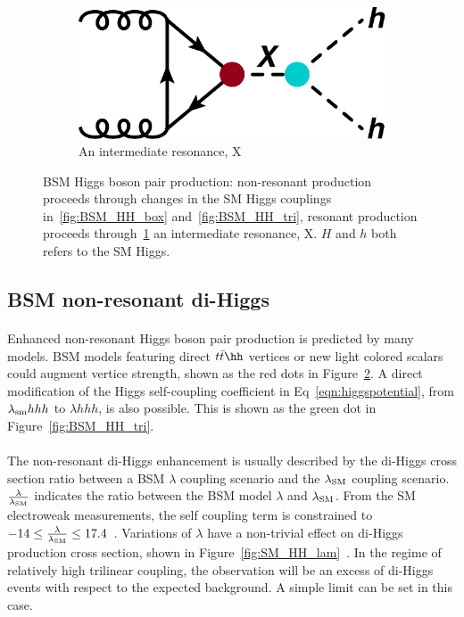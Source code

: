 \begin{figure}[htbp!]
\begin{subfigure}[c]{0.3\textwidth}
        \includegraphics[width=\textwidth]{figures/theory/BSM_HH_X}
        \caption{An intermediate resonance, X}
        \label{fig:BSM_HH_X}
    \end{subfigure}
\caption{BSM Higgs boson pair production: non-resonant production proceeds through changes in the SM Higgs couplings in~\ref{fig:BSM_HH_box} and~\ref{fig:BSM_HH_tri}, resonant production proceeds through~\ref{fig:BSM_HH_X} an intermediate resonance, X. $H$ and $h$ both refers to the SM Higgs.}
\label{fig:BSM_HH}
\end{figure}

\subsection{BSM non-resonant di-Higgs}
\paragraph{}
Enhanced non-resonant Higgs boson pair production is predicted by many models. BSM models featuring direct $t\bar{t}\hh$ vertices \cite{Grober:2010yv, Contino:2012xk} or new light colored scalars \cite{PhysRevD.86.095023} could augment vertice strength, shown as the red dots in Figure~\ref{fig:BSM_HH}. 
A direct modification of the Higgs self-coupling coefficient in Eq~\ref{eqn:higgspotential}, from $\lambda_{\rm sm}hhh$ to $\lambda hhh$, is also possible. This is shown as the green dot in Figure~\ref{fig:BSM_HH_tri}. 

\paragraph{}
The non-resonant di-Higgs enhancement is usually described by the di-Higgs cross section ratio between a BSM $\lambda$ coupling scenario and the $\lambda_{\rm SM}$ coupling scenario.
$\frac{\rm \lambda}{\rm \lambda_{\rm SM}}$ indicates the ratio between the BSM model $\lambda$ and $\lambda_{\rm SM}$.
From the SM electroweak measurements, the self coupling term is constrained to $-14 \leq \frac{\rm \lambda}{\rm \lambda_{\rm SM}} \leq 17.4$~\cite{Kribs:2017znd}. 
Variations of $\lambda$ have a non-trivial effect on di-Higgs production cross section, shown in Figure~\ref{fig:SM_HH_lam}~\cite{Frederix:2014hta}. 
In the regime of relatively high trilinear coupling, the observation will be an excess of di-Higgs events with respect to the expected background. 
A simple limit can be set in this case.

